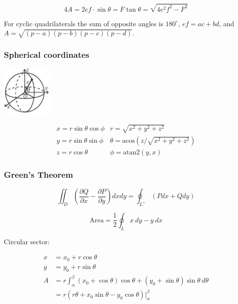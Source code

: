 \[ 4A = 2ef \cdot \sin\theta = F\tan\theta = \sqrt{4e^2f^2-F^2} \]

 For cyclic quadrilaterals the sum of opposite angles is $180^\circ$,
$ef = ac + bd$, and $A = \sqrt{(p-a)(p-b)(p-c)(p-d)}$.

\subsubsection{Spherical coordinates}
\begin{center}
\includegraphics[width=25mm]{sphericalCoordinates.pdf}
\end{center}
\[\begin{array}{cc}
x = r\sin\theta\cos\phi & r = \sqrt{x^2+y^2+z^2}\\
y = r\sin\theta\sin\phi & \theta = \textrm{acos}(z/\sqrt{x^2+y^2+z^2})\\
z = r\cos\theta & \phi = \textrm{atan2}(y,x)
\end{array}\]

\subsubsection{Green's Theorem}

\[ \iint_D \left( \frac{\partial Q}{\partial x} - \frac{\partial P}{\partial y} \right) dxdy
= \oint_{L^+} (Pdx + Qdy)\]

\[ \text{Area} = \frac{1}{2} \oint_L x\ dy - y\ dx \]

Circular sector:

\begin{align*}
    x &= x_0 + r\cos\theta \\
    y &= y_0 + r\sin\theta \\
    A &= r \int_\alpha^\beta (x_0 + \cos\theta)\cos\theta + (y_0 + \sin\theta)\sin\theta\ d\theta \\
      &= r (r \theta + x_0 \sin\theta - y_0 \cos\theta) \rvert_\alpha^\beta
\end{align*}

